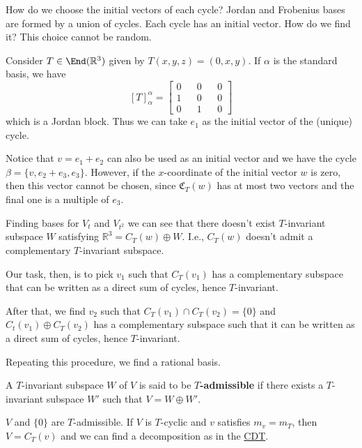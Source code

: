 How do we choose the initial vectors of each cycle? Jordan and Frobenius bases are formed by a union of cycles. Each cycle has an initial vector. How do we find it? This choice cannot be random.

\begin{example}
	Consider $T \in \End(\mathbb{R}^3)$ given by $T(x,y,z) = (0,x,y)$. If $\alpha$ is the standard basis, we have 
	\[
		[T]_\alpha^\alpha = \begin{bmatrix}
			0 && 0 && 0 \\
			1 && 0 && 0 \\
			0 && 1 && 0
		\end{bmatrix}
	\]
	which is a Jordan block. Thus we can take $e_1$ as the initial vector of the (unique) cycle.

	Notice that $v = e_1 + e_2$ can also be used as an initial vector and we have the cycle $\beta = \{ v, e_2 + e_3, e_3 \}$. However, if the $x$-coordinate of the initial vector $w$ is zero, then this vector cannot be chosen, since $\mathfrak{C}_T(w)$ has at most two vectors and the final one is a multiple of $e_3$. 

	Finding bases for $V_t$ and $V_{t^2}$ we can see that there doesn't exist $T$-invariant subspace $W$ satisfying $\mathbb{R}^3 = C_T(w) \oplus W$. I.e., $C_T(w)$ doesn't admit a complementary $T$-invariant subspace.
\end{example}

Our task, then, is to pick $v_1$ such that $C_T(v_1)$ has a complementary subspace that can be written as a direct sum of cycles, hence $T$-invariant.

After that, we find $v_2$ such that $C_T(v_1) \cap C_T(v_2) = \{ 0 \}$ and $C_t(v_1) \oplus C_T(v_2)$ has a complementary subspace such that it can be written as a direct sum of cycles, hence $T$-invariant. 

Repeating this procedure, we find a rational basis.

\begin{definition}
	A $T$-invariant subspace $W$ of $V$ is said to be \textbf{$T$-admissible} if there exists a $T$-invariant subspace $W'$ such that $V = W \oplus W'$.
\end{definition}

\begin{example}
	$V$ and $\{ 0 \}$ are $T$-admissible. If $V$ is $T$-cyclic and $v$ satisfies $m_v = m_T$, then $V = C_T(v)$ and we can find a decomposition as in the \hyperref[thm:CDT]{CDT}.
\end{example}


